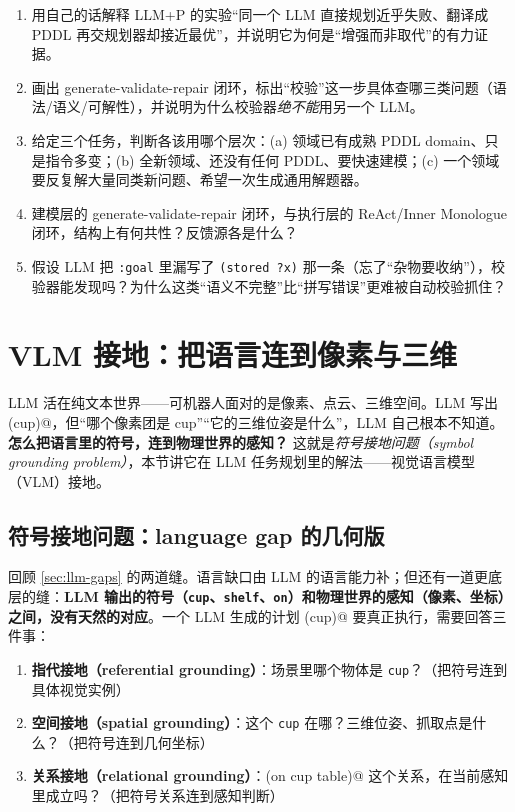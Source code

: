 \begin{exercise}
\begin{enumerate}
  \item 用自己的话解释 LLM+P 的实验“同一个 LLM 直接规划近乎失败、翻译成 PDDL 再交规划器却接近最优”，并说明它为何是“增强而非取代”的有力证据。
  \item 画出 generate-validate-repair 闭环，标出“校验”这一步具体查哪三类问题（语法/语义/可解性），并说明为什么校验器\emph{绝不能}用另一个 LLM。
  \item 给定三个任务，判断各该用哪个层次：(a) 领域已有成熟 PDDL domain、只是指令多变；(b) 全新领域、还没有任何 PDDL、要快速建模；(c) 一个领域要反复解大量同类新问题、希望一次生成通用解题器。
  \item 建模层的 generate-validate-repair 闭环，与执行层的 ReAct/Inner Monologue 闭环，结构上有何共性？反馈源各是什么？
  \item 假设 LLM 把 \texttt{:goal} 里漏写了 \texttt{(stored ?x)} 那一条（忘了“杂物要收纳”），校验器能发现吗？为什么这类“语义不完整”比“拼写错误”更难被自动校验抓住？
\end{enumerate}
\end{exercise}

\section{VLM 接地：把语言连到像素与三维}
\label{sec:grounding}

LLM 活在纯文本世界——可机器人面对的是像素、点云、三维空间。LLM 写出 \verb@pick(cup)@，但“哪个像素团是 cup”“它的三维位姿是什么”，LLM 自己根本不知道。\textbf{怎么把语言里的符号，连到物理世界的感知？} 这就是\emph{符号接地问题（symbol grounding problem）}，本节讲它在 LLM 任务规划里的解法——视觉语言模型（VLM）接地。

\subsection{符号接地问题：language gap 的几何版}
\label{sec:grounding-problem}

回顾 \cref{sec:llm-gaps} 的两道缝。语言缺口由 LLM 的语言能力补；但还有一道更底层的缝：\textbf{LLM 输出的符号（\texttt{cup}、\texttt{shelf}、\texttt{on}）和物理世界的感知（像素、坐标）之间，没有天然的对应}。一个 LLM 生成的计划 \verb@pick(cup)@ 要真正执行，需要回答三件事：

\begin{enumerate}
  \item \textbf{指代接地（referential grounding）}：场景里哪个物体是 \texttt{cup}？（把符号连到具体视觉实例）
  \item \textbf{空间接地（spatial grounding）}：这个 \texttt{cup} 在哪？三维位姿、抓取点是什么？（把符号连到几何坐标）
  \item \textbf{关系接地（relational grounding）}：\verb@(on cup table)@ 这个关系，在当前感知里成立吗？（把符号关系连到感知判断）
\end{enumerate}

